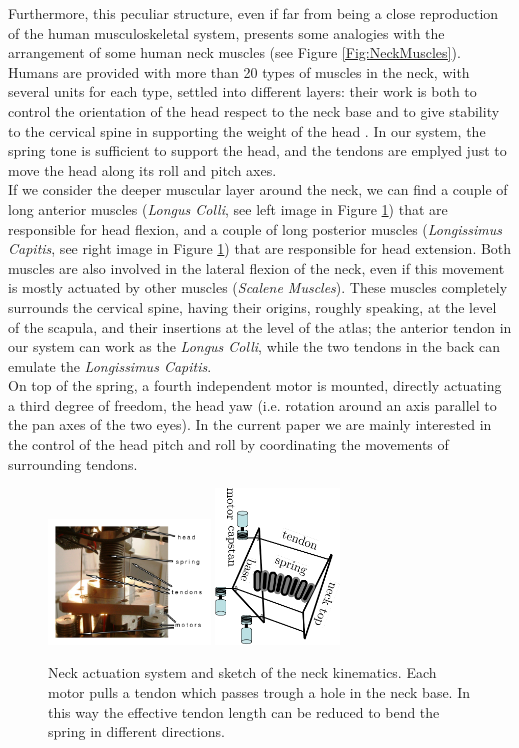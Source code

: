 \documentclass[conference]{IEEEtran}
\numberwithin{equation}{section}
\begin{document}
Furthermore, this peculiar structure, even if far from being a close reproduction of the human musculoskeletal system, presents some analogies with the arrangement of some human neck muscles (see Figure \ref{Fig:NeckMuscles}). Humans are provided with more than 20 types of muscles in the neck, with several units for each type, settled into different layers: their work is both to control the orientation of the head respect to the neck base and to give stability to the cervical spine in supporting the weight of the head \cite{Kendall05muscles}. In our system, the spring tone is sufficient to support the head, and the tendons are emplyed just to move the head along its roll and pitch axes.\\If we consider the deeper muscular layer around the neck, we can find a couple of long anterior muscles (\emph{Longus Colli}, see left image in Figure \ref{Fig:HeadAct}) that are responsible for head flexion, and a couple of long posterior muscles (\emph{Longissimus Capitis}, see right image in Figure \ref{Fig:HeadAct}) that are responsible for head extension. Both muscles are also involved in the lateral flexion of the neck, even if this movement is mostly actuated by other muscles (\emph{Scalene Muscles}). These muscles completely surrounds the cervical spine, having their origins, roughly speaking, at the level of the scapula, and their insertions at the level of the atlas; the anterior tendon in our system can work as the \emph{Longus Colli}, while the two tendons in the back can emulate the \emph{Longissimus Capitis}.\\On top of the spring, a fourth independent motor is mounted, directly actuating a third degree of freedom, the head yaw (i.e. rotation around an axis parallel to the pan axes of the two eyes). In the current paper we are mainly interested in the control of the head pitch and roll by coordinating the movements of surrounding tendons.

\begin{figure}[tbp]
\centering
\includegraphics[width=43mm]{image/HeadAct.pdf} 
\includegraphics[width=33mm, angle=90]{image/NeckModelScheme.pdf} 
\caption{Neck actuation system and sketch of the neck kinematics. Each motor pulls a tendon which passes trough a hole in the neck base. In this way the effective tendon length can be reduced to bend the spring in different directions.}
\label{Fig:HeadAct}
\end{figure}
\end{document}
